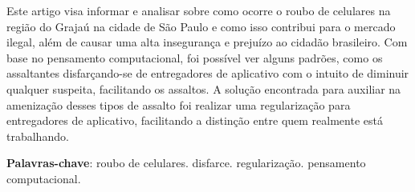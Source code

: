 \documentclass[
	article,			
	12pt,				
	oneside,			
	a4paper,			
	english,			
	brazil,				
	sumario=tradicional
	]{abntex2}
\begin{document}
\frenchspacing 
\maketitle

\begin{resumoumacoluna}
    
	Este artigo visa informar e analisar sobre como ocorre o roubo de celulares na região
	do Grajaú na cidade de São Paulo e como isso contribui para o mercado ilegal, além de 
	causar uma alta insegurança e prejuízo ao cidadão brasileiro. Com base no pensamento 
	computacional, foi possível ver alguns padrões, como os assaltantes disfarçando-se de
	entregadores de aplicativo com o intuito de diminuir qualquer suspeita, facilitando
	os assaltos. A solução encontrada para auxiliar na amenização desses tipos de assalto
	foi realizar uma regularização para entregadores de aplicativo, facilitando a
	distinção entre quem realmente está trabalhando.
    
    \vspace{\onelineskip}
    
    \noindent
    \textbf{Palavras-chave}: roubo de celulares. disfarce. regularização. pensamento computacional.
\end{resumoumacoluna}

\textual

\newpage
















\newpage

\end{document}
